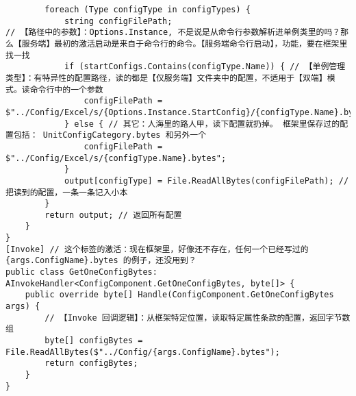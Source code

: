 \documentclass[9pt, b5paper]{article}
\begin{document}
\begin{verbatim}
        foreach (Type configType in configTypes) {
            string configFilePath;
// 【路径中的参数】：Options.Instance, 不是说是从命令行参数解析进单例类里的吗？那么【服务端】最初的激活启动是来自于命令行的命令。【服务端命令行启动】，功能，要在框架里找一找
            if (startConfigs.Contains(configType.Name)) { // 【单例管理类型】：有特异性的配置路径，读的都是【仅服务端】文件夹中的配置，不适用于【双端】模式。读命令行中的一个参数
                configFilePath = $"../Config/Excel/s/{Options.Instance.StartConfig}/{configType.Name}.bytes";    
            } else { // 其它：人海里的路人甲，读下配置就扔掉。 框架里保存过的配置包括： UnitConfigCategory.bytes 和另外一个
                configFilePath = $"../Config/Excel/s/{configType.Name}.bytes"; 
            }
            output[configType] = File.ReadAllBytes(configFilePath); // 把读到的配置，一条一条记入小本
        }
        return output; // 返回所有配置 
    }
}
[Invoke] // 这个标签的激活：现在框架里，好像还不存在，任何一个已经写过的 {args.ConfigName}.bytes 的例子，还没用到？
public class GetOneConfigBytes: AInvokeHandler<ConfigComponent.GetOneConfigBytes, byte[]> {
    public override byte[] Handle(ConfigComponent.GetOneConfigBytes args) {
        // 【Invoke 回调逻辑】：从框架特定位置，读取特定属性条款的配置，返回字节数组
        byte[] configBytes = File.ReadAllBytes($"../Config/{args.ConfigName}.bytes");
        return configBytes;
    }
}
\end{verbatim}
\end{document}
